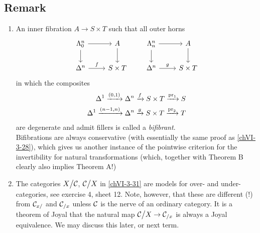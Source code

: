     \subsection{Remark}\label{chVI-3-32}
        \begin{enumerate}[label=\roman*)]
            \item
                An inner fibration $A \to S \times T$ such that all outer horns
                \begin{equation*}
                    \begin{tikzcd}
                        \horn{n}{0} \arrow[d] \arrow[r] & A \arrow[d] \\
                        \Delta^n \arrow[r, "f"] & S \times T 
                    \end{tikzcd}
                    \qquad
                    \begin{tikzcd}
                        \horn{n}{n} \arrow[d] \arrow[r] & A \arrow[d] \\
                        \Delta^n \arrow[r, "g"] & S \times T 
                    \end{tikzcd}
                \end{equation*}
                in which the composites
                \begin{align*}
                    \Delta^1 \xrightarrow{(0,1)} \Delta^n \xrightarrow{f} S \times T \xrightarrow{\operatorname{pr}_1} S \\
                    \Delta^1 \xrightarrow{(n-1,n)} \Delta^n \xrightarrow{g} S \times T \xrightarrow{\operatorname{pr}_2} T
                \end{align*}
                are degenerate and admit fillers is called a \emph{bifibrant}.\\
                Bifibrations are always conservative (with essentially the same proof as \ref{chVI-3-28}), which gives us another instance of the pointwise criterion for the invertibility for natural transformations (which, together with Theorem B clearly also implies Theorem A!)

            \item
                The categories $X \big/ \mathcal{C}$, $\mathcal{C} \big/ X$ in \ref{chVI-3-31} are models for over- and under-categories, see exercise 4, sheet 12. Note, however, that these are different (!) from $\mathcal{C}_{x/}$ and $\mathcal{C}_{/x}$ unless $\mathcal{C}$ is the nerve of an ordinary category. It is a theorem of Joyal that the natural map $\mathcal{C} \big/ X \to \mathcal{C}_{/x}$ is always a Joyal equivalence. We may discuss this later, or next term.


\end{enumerate}

